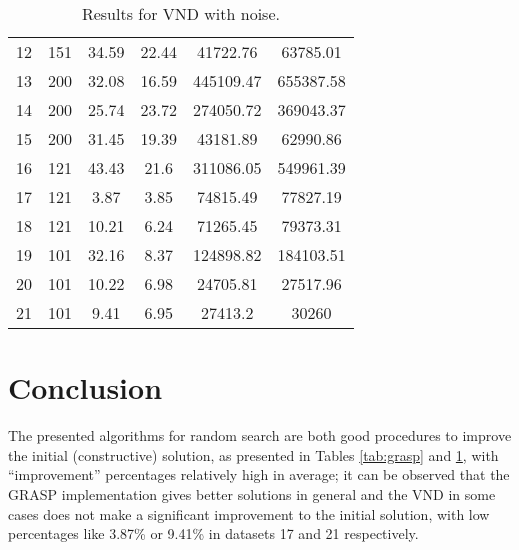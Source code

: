 \documentclass[10pt,twoside]{article}
\begin{document}
\begin{table}[H]
\begin{tabular}{cccccc}
12                & 151            & 34.59       & 22.44             & 41722.76               & 63785.01          \\
13                & 200            & 32.08       & 16.59             & 445109.47              & 655387.58         \\
14                & 200            & 25.74       & 23.72             & 274050.72              & 369043.37         \\
15                & 200            & 31.45       & 19.39             & 43181.89               & 62990.86          \\
16                & 121            & 43.43       & 21.6              & 311086.05              & 549961.39         \\
17                & 121            & 3.87        & 3.85              & 74815.49               & 77827.19          \\
18                & 121            & 10.21       & 6.24              & 71265.45               & 79373.31          \\
19                & 101            & 32.16       & 8.37              & 124898.82              & 184103.51         \\
20                & 101            & 10.22       & 6.98              & 24705.81               & 27517.96          \\
21                & 101            & 9.41        & 6.95              & 27413.2                & 30260             \\ \hline
\end{tabular}
\caption{Results for VND with noise.}
\label{tab:vnd_noise}
\end{table}

\section{Conclusion}
The presented algorithms for random search are both good procedures to improve the initial (constructive) solution, as presented in Tables \ref{tab:grasp} and \ref{tab:vnd_noise}, with ``improvement'' percentages relatively high in average; it can be observed that the GRASP implementation gives better solutions in general and the VND in some cases does not make a significant improvement to the initial solution, with low percentages like 3.87\% or 9.41\% in datasets 17 and 21 respectively.
\end{document}
